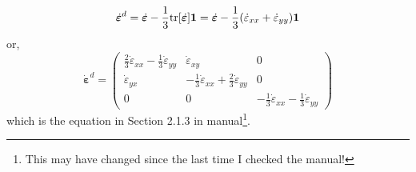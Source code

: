 \[
\dot{\bm \varepsilon}^d 
= \dot{\bm \varepsilon} -\frac{1}{3} {\rm tr}[\dot{\bm \varepsilon}]   {\bm 1} 
= \dot{\bm \varepsilon} -\frac{1}{3} (\dot{\varepsilon}_{xx} +\dot{\varepsilon}_{yy}   )  {\bm 1} 
\]
or,
\[
\dot{\bm \varepsilon}^d = 
\left(
\begin{array}{ccc}
\frac{2}{3}\dot{\varepsilon}_{xx} -\frac{1}{3}\dot{\varepsilon}_{yy} & \dot{\varepsilon}_{xy} & 0 \\
\dot{\varepsilon}_{yx} & -\frac{1}{3}\dot{\varepsilon}_{xx} +\frac{2}{3} \dot{\varepsilon}_{yy} & 0 \\
0 & 0 & -\frac{1}{3} \dot{\varepsilon}_{xx} -\frac{1}{3}\dot{\varepsilon}_{yy}
\end{array}
\right)
\]
which is the equation in Section 2.1.3 in \aspect{} manual\footnote{This may have changed since 
the last time I checked the manual!}. 

